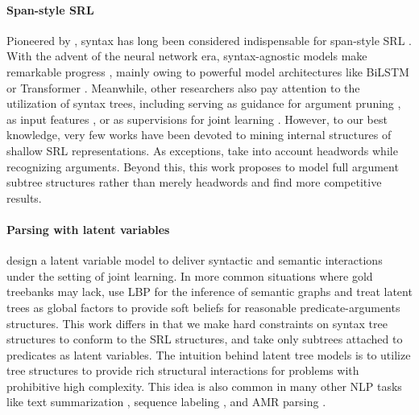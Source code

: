 \documentclass[11pt]{article}
\begin{document}
\paragraph{Span-style SRL}
Pioneered by \citet{gildea-jurafsky-2002-automatic}, syntax has long been considered indispensable for span-style SRL \cite{punyakanok-etal-2008-importance}.
With the advent of the neural network era, syntax-agnostic models make remarkable progress \cite{zhou-xu-2015-end,tan-etal-2018-deep,cai-etal-2018-full}, mainly owing to powerful model architectures like BiLSTM \cite{yarin-etal-2016-dropout} or Transformer \cite{vaswani-2017-attention}.
Meanwhile, other researchers also pay attention to the utilization of syntax trees, including serving as guidance for argument pruning \cite{he-etal-2018-syntax}, as input features \cite{marcheggiani-titov-2017-encoding,xia-etal-2019-syntax,mohammadshahi-etal-2021-g2g}, or as supervisions for joint learning \cite{swayamdipta-etal-2018-syntactic}.
However, to our best knowledge, very few works have been devoted to mining internal structures of shallow SRL representations.
As exceptions, \citet{he-etal-2018-jointly,zhang-etal-2021-comparing} take into account headwords while recognizing arguments.
Beyond this, this work proposes to model full argument subtree structures rather than merely headwords and find more competitive results.








\paragraph{Parsing with latent variables}
\citet{henderson-etal-2008-latent, henderson-etal-2013-multilingual} design a latent variable model to deliver syntactic and semantic interactions under the setting of joint learning.
In more common situations where gold treebanks may lack, \citet{naradowsky-etal-2012-improving,gormley-etal-2014-low} use LBP for the inference of semantic graphs and treat latent trees as global factors \cite{smith-eisner-2008-dependency} to provide soft beliefs for reasonable predicate-arguments structures.
This work differs in that we make hard constraints on syntax tree structures to conform to the SRL structures, and take only subtrees attached to predicates as latent variables.
The intuition behind latent tree models \cite{marina-michael-2000-mixure,chu-etal-2017-latent,kim-2017-structured} is to utilize tree structures to provide rich structural interactions for problems with prohibitive high complexity.
This idea is also common in many other NLP tasks like text summarization \cite{liu-lapata-2018-learning}, sequence labeling \cite{zhou-etal-2020-latent}, and AMR parsing \cite{zhou-etal-2020-amr}.
\end{document}
